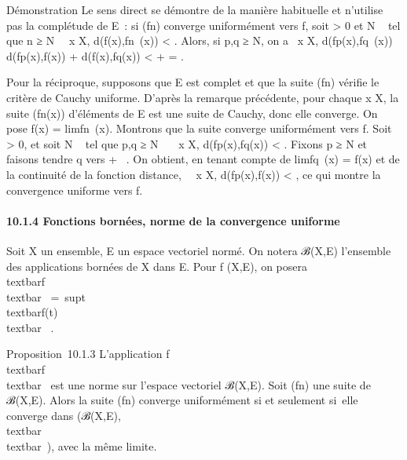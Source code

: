 Démonstration Le sens direct se démontre de la manière habituelle et
n'utilise pas la complétude de E~: si (fn) converge
uniformément vers f, soit \epsilon \textgreater{} 0 et N \in {}~ tel que n ≥ N
\rigtharrow~\forall~x \in X, d(f(x),fn~(x)) \textless{}
\epsilon {} . Alors, si p,q ≥ N, on a
\forall~x \in X, d(fp(x),fq~(x)) \leq
d(fp(x),f(x)) + d(f(x),fq(x)) \textless{} \epsilon
{} + \epsilon {} = \epsilon.

Pour la réciproque, supposons que E est complet et que la suite
(fn) vérifie le critère de Cauchy uniforme. D'après la
remarque précédente, pour chaque x \in X, la suite (fn(x))
d'éléments de E est une suite de Cauchy, donc elle converge. On pose
f(x) = limfn~(x). Montrons que la
suite converge uniformément vers f. Soit \epsilon \textgreater{} 0, et soit N \in
{}~ tel que p,q ≥ N \rigtharrow~\forall~~x \in X,
d(fp(x),fq(x)) \textless{} \epsilon {} . Fixons p ≥ N et faisons tendre q vers + \infty~. On obtient, en tenant
compte de limfq~(x) = f(x) et de la
continuité de la fonction distance, \forall~~x \in X,
d(fp(x),f(x)) \leq \epsilon {} \textless{} \epsilon, ce
qui montre la convergence uniforme vers f.

\paragraph{10.1.4 Fonctions bornées, norme de la convergence uniforme}

Soit X un ensemble, E un espace vectoriel normé. On notera ℬ(X,E)
l'ensemble des applications bornées de X dans E. Pour f (X,E), on
posera \\textbar{}f\\textbar{}\infty~
=\
supt\inX\\textbar{}f(t)\\textbar{}
\in {}~.

Proposition~10.1.3 L'application
f\mapsto~\\textbar{}f\\textbar{}\infty~
est une norme sur l'espace vectoriel ℬ(X,E). Soit (fn) une
suite de ℬ(X,E). Alors la suite (fn) converge uniformément si
et seulement si~elle converge dans (ℬ(X,E),\\textbar{}
\\textbar{}\infty~), avec la même limite.


